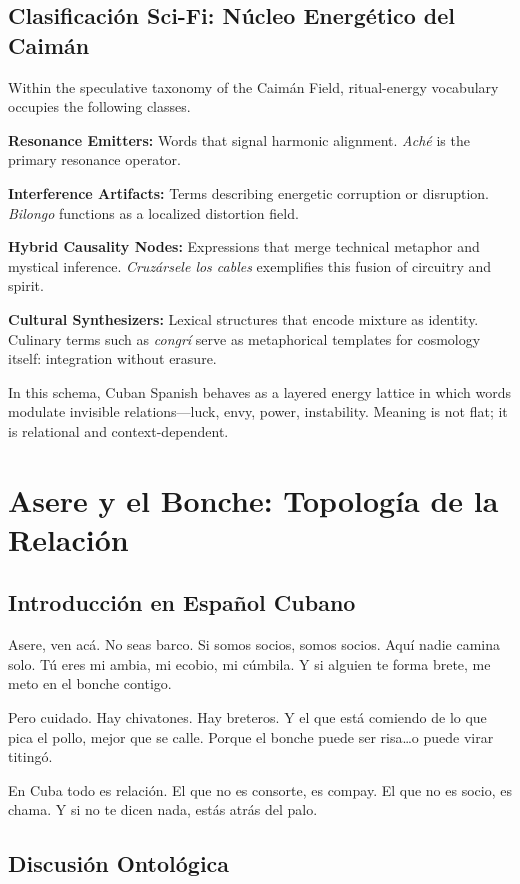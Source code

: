 \documentclass[12pt]{article}
\begin{document}
\subsection*{Clasificación Sci-Fi: Núcleo Energético del Caimán}

Within the speculative taxonomy of the Caimán Field, ritual-energy vocabulary occupies the following classes.

\textbf{Resonance Emitters:} Words that signal harmonic alignment. \textit{Aché} is the primary resonance operator.

\textbf{Interference Artifacts:} Terms describing energetic corruption or disruption. \textit{Bilongo} functions as a localized distortion field.

\textbf{Hybrid Causality Nodes:} Expressions that merge technical metaphor and mystical inference. \textit{Cruzársele los cables} exemplifies this fusion of circuitry and spirit.

\textbf{Cultural Synthesizers:} Lexical structures that encode mixture as identity. Culinary terms such as \textit{congrí} serve as metaphorical templates for cosmology itself: integration without erasure.

In this schema, Cuban Spanish behaves as a layered energy lattice in which words modulate invisible relations---luck, envy, power, instability. Meaning is not flat; it is relational and context-dependent.

\section{Asere y el Bonche: Topología de la Relación}

\subsection*{Introducción en Español Cubano}

Asere, ven acá. No seas barco. Si somos socios, somos socios. Aquí nadie camina solo. Tú eres mi ambia, mi ecobio, mi cúmbila. Y si alguien te forma brete, me meto en el bonche contigo.

Pero cuidado. Hay chivatones. Hay breteros. Y el que está comiendo de lo que pica el pollo, mejor que se calle. Porque el bonche puede ser risa\ldots o puede virar titingó.

En Cuba todo es relación. El que no es consorte, es compay. El que no es socio, es chama. Y si no te dicen nada, estás atrás del palo.

\subsection*{Discusión Ontológica}
\end{document}
